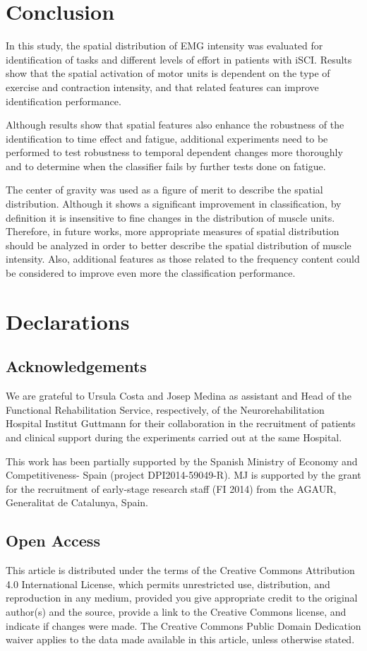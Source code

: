 \section{Conclusion}
In this study, the spatial distribution of EMG intensity was evaluated for identification of tasks and different levels of effort in patients with iSCI. Results show that the spatial activation of motor units is dependent on the type of exercise and contraction intensity, and that related features can improve identification performance.

Although results show that spatial features also enhance the robustness of the identification to time effect and fatigue, additional experiments need to be performed to test robustness to temporal dependent changes more thoroughly and to determine when the classifier fails by further tests done on fatigue.

The center of gravity was used as a figure of merit to describe the spatial distribution. Although it shows a significant improvement in classification, by definition it is insensitive to fine changes in the distribution of muscle units. Therefore, in future works, more appropriate measures of spatial distribution should be analyzed in order to better describe the spatial distribution of muscle intensity. Also, additional features as those related to the frequency content could be considered to improve even more the classification performance.




\section{Declarations} 
\subsection{Acknowledgements}
We are grateful to Ursula Costa and Josep Medina as assistant and Head of the Functional Rehabilitation Service, respectively, of the Neurorehabilitation Hospital Institut Guttmann for their collaboration in the recruitment of patients and clinical support during the experiments carried out at the same Hospital.

This work has been partially supported by the Spanish Ministry of Economy and Competitiveness- Spain (project DPI2014-59049-R). MJ is supported by the grant for the recruitment of early-stage research staff (FI 2014) from the AGAUR, Generalitat de Catalunya, Spain.

\subsection{Open Access}
This article is distributed under the terms of the Creative Commons Attribution 4.0 International License, which permits unrestricted use, distribution, and reproduction in any medium, provided you give appropriate credit to the original author(s) and the source, provide a link to the Creative Commons license, and indicate if changes were made. The Creative Commons Public Domain Dedication waiver applies to the data made available in this article, unless otherwise stated.

